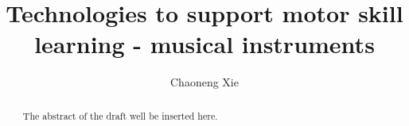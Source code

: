 \documentclass{article}
\begin{document}
\title{Technologies to support motor skill learning - musical instruments}

\author{Chaoneng Xie}

\begin{abstract}
    The abstract of the draft well be inserted here.
\end{abstract}
\end{document}
